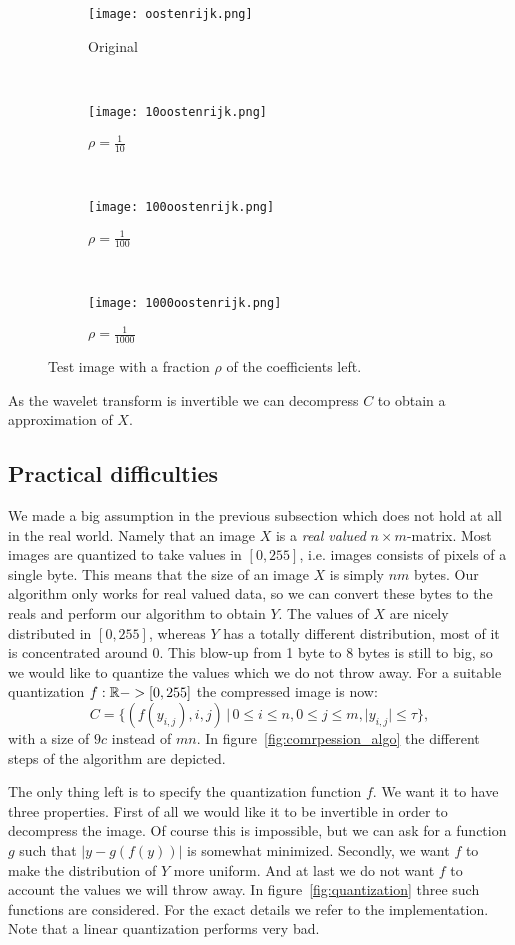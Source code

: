 \begin{figure}
	\begin{subfigure}[b]{0.25\textwidth}
		\centering
		\texttt{[image: oostenrijk.png]}
		\caption{Original}
	\end{subfigure}~
	\begin{subfigure}[b]{0.25\textwidth}
		\centering
		\texttt{[image: 10oostenrijk.png]}
		\caption{$\rho=\frac{1}{10}$}
	\end{subfigure}~
	\begin{subfigure}[b]{0.25\textwidth}
		\centering
		\texttt{[image: 100oostenrijk.png]}
		\caption{$\rho=\frac{1}{100}$}
	\end{subfigure}~
	\begin{subfigure}[b]{0.25\textwidth}
		\centering
		\texttt{[image: 1000oostenrijk.png]}
		\caption{$\rho=\frac{1}{1000}$}
	\end{subfigure}
	\caption{Test image with a fraction $\rho$ of the coefficients left.}
	\label{fig:compression}
\end{figure}

As the wavelet transform is invertible we can decompress $C$ to obtain a approximation of $X$.


\subsection{Practical difficulties}
We made a big assumption in the previous subsection which does not hold at all in the real world. Namely that an image $X$ is a \emph{real valued} $n \times m$-matrix. Most images are quantized to take values in $[0, 255]$, i.e. images consists of pixels of a single byte. This means that the size of an image $X$ is simply $nm$ bytes. Our algorithm only works for real valued data, so we can convert these bytes to the reals and perform our algorithm to obtain $Y$. The values of $X$ are nicely distributed in $[0, 255]$, whereas $Y$ has a totally different distribution, most of it is concentrated around 0. This blow-up from 1 byte to 8 bytes is still to big, so we would like to quantize the values which we do not throw away. For a suitable quantization $f: \mathbb{R} -> [0, 255]$ the compressed image is now:
\[ C = \{ (f(y_{i,j}), i, j) \,|\, 0 \leq i \leq n, 0 \leq j \leq m, |y_{i,j}| \leq \tau \}, \]
with a size of $9c$ instead of $mn$. In figure~\ref{fig:comrpession_algo} the different steps of the algorithm are depicted.

The only thing left is to specify the quantization function $f$. We want it to have three properties. First of all we would like it to be invertible in order to decompress the image. Of course this is impossible, but we can ask for a function $g$ such that $|y - g(f(y))|$ is somewhat minimized. Secondly, we want $f$ to make the distribution of $Y$ more uniform. And at last we do not want $f$ to account the values we will throw away. In figure~\ref{fig:quantization} three such functions are considered. For the exact details we refer to the implementation. Note that a linear quantization performs very bad.

